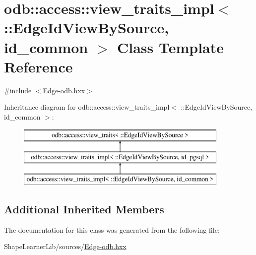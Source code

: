 \hypertarget{classodb_1_1access_1_1view__traits__impl_3_01_1_1_edge_id_view_by_source_00_01id__common_01_4}{}\section{odb\+:\+:access\+:\+:view\+\_\+traits\+\_\+impl$<$ \+:\+:Edge\+Id\+View\+By\+Source, id\+\_\+common $>$ Class Template Reference}
\label{classodb_1_1access_1_1view__traits__impl_3_01_1_1_edge_id_view_by_source_00_01id__common_01_4}


{\ttfamily \#include $<$Edge-\/odb.\+hxx$>$}

Inheritance diagram for odb\+:\+:access\+:\+:view\+\_\+traits\+\_\+impl$<$ \+:\+:Edge\+Id\+View\+By\+Source, id\+\_\+common $>$\+:\begin{figure}[H]
\begin{center}
\leavevmode
\includegraphics[height=3.000000cm]{de/ddd/classodb_1_1access_1_1view__traits__impl_3_01_1_1_edge_id_view_by_source_00_01id__common_01_4}
\end{center}
\end{figure}
\subsection*{Additional Inherited Members}


The documentation for this class was generated from the following file\+:\begin{DoxyCompactItemize}
\item 
Shape\+Learner\+Lib/sources/\hyperlink{_edge-odb_8hxx}{Edge-\/odb.\+hxx}\end{DoxyCompactItemize}
